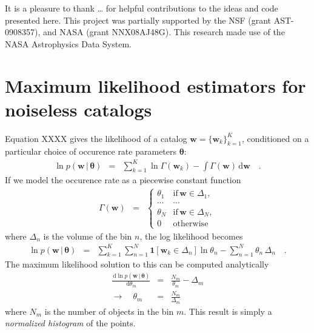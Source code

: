 \documentclass[12pt,preprint]{aastex}
\newcommand{\project}[1]{{\sffamily #1}}
\newcommand{\sectlabel}[1]{\label{sect:#1}}
\newcommand{\dd}{\ensuremath{\,\mathrm{d}}}
\newcommand{\bvec}[1]{\ensuremath{\boldsymbol{#1}}}
\newcommand{\rate}{\ensuremath{\Gamma}}
\newcommand{\ratepar}{{\ensuremath{\theta}}}
\newcommand{\ratepars}{{\ensuremath{\bvec{\ratepar}}}}
\newcommand{\entry}{{\ensuremath{\bvec{w}}}}
\newcommand{\catalog}{{\ensuremath{\bvec{\entry}}}}
\newcommand{\binarea}{{\ensuremath{\Delta}}}
\begin{document}
\acknowledgments
It is a pleasure to thank
    \ldots
for helpful contributions to the ideas and code presented here.
This project was partially supported by the NSF (grant AST-0908357), and NASA
(grant NNX08AJ48G).
This research made use of the NASA \project{Astrophysics Data System}.

\appendix

\section{Maximum likelihood estimators for noiseless catalogs}
\sectlabel{histogram}

Equation XXXX gives the likelihood of a catalog $\catalog =
\{\entry_k\}_{k=1}^K$, conditioned on a particular choice of occurence rate
parameters \ratepars:
\begin{eqnarray}
\ln p(\catalog\,|\,\ratepars) &=& \sum_{k=1}^K \ln \rate(\entry_k)
    - \int \rate(\entry) \dd\entry \quad.
\end{eqnarray}
If we model the occurence rate as a piecewise constant function
\begin{eqnarray}
\rate (\entry) &=& \left \{\begin{array}{ll}
\ratepar_1 & \mathrm{if\,} \entry \in \binarea_1, \\
\cdots & \cdots \\
\ratepar_N & \mathrm{if\,} \entry \in \binarea_N, \\
0 & \mathrm{otherwise}
\end{array}\right.
\end{eqnarray}
where $\binarea_n$ is the volume of the bin $n$, the log likelihood becomes
\begin{eqnarray}
\ln p(\catalog\,|\,\ratepars) &=&
    \sum_{k=1}^K \sum_{n=1}^N \mathbf{1}[\entry_k \in \binarea_n]
        \ln\ratepar_n
    - \sum_{n=1}^N \ratepar_n\,\binarea_n \quad.
\end{eqnarray}
The maximum likelihood solution to this can be computed analytically
\begin{eqnarray}
\frac{\dd \ln p(\catalog\,|\,\ratepars)}{\dd \ratepar_m} &=&
    \frac{N_m}{\ratepar_m} - \binarea_m \\
\to \quad \ratepar_m &=& \frac{N_m}{\binarea_m}
\end{eqnarray}
where $N_m$ is the number of objects in the bin $m$.
This result is simply a \emph{normalized histogram} of the points.
\end{document}
